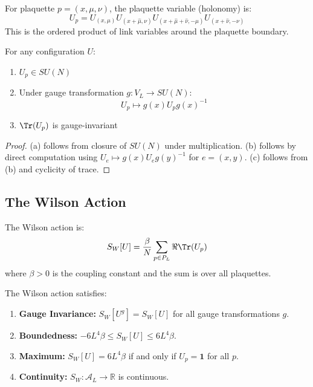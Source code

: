 \begin{definition}
\label{def:plaquette-var}
For plaquette $p = (x, \mu, \nu)$, the plaquette variable (holonomy) is:
\[
U_p = U_{(x,\mu)} U_{(x+\hat{\mu},\nu)} U_{(x+\hat{\mu}+\hat{\nu},-\mu)} U_{(x+\hat{\nu},-\nu)}
\]
This is the ordered product of link variables around the plaquette boundary.
\end{definition}

\begin{lemma}
\label{lem:plaquette-props}
For any configuration $U$:
\begin{enumerate}[label=(\alph*)]
    \item $U_p \in SU(N)$
    \item Under gauge transformation $g : V_L \to SU(N)$:
    \[
    U_p \mapsto g(x) U_p g(x)^{-1}
    \]
    \item $\Tr(U_p)$ is gauge-invariant
\end{enumerate}
\end{lemma}

\begin{proof}
(a) follows from closure of $SU(N)$ under multiplication.
(b) follows by direct computation using $U_e \mapsto g(x)U_e g(y)^{-1}$ for $e = (x,y)$.
(c) follows from (b) and cyclicity of trace.
\end{proof}

\subsection{The Wilson Action}

\begin{definition}
\label{def:wilson-action}
\label{def:wilson_action}
The Wilson action is:
\[
S_W[U] = \frac{\beta}{N} \sum_{p \in P_L} \Re \Tr(U_p)
\]
where $\beta > 0$ is the coupling constant and the sum is over all plaquettes.
\end{definition}

\begin{lemma}
\label{lem:action-props}
The Wilson action satisfies:
\begin{enumerate}[label=(\alph*)]
    \item \textbf{Gauge Invariance:} $S_W[U^g] = S_W[U]$ for all gauge transformations $g$.
    \item \textbf{Boundedness:} $-6L^4\beta \leq S_W[U] \leq 6L^4\beta$.
    \item \textbf{Maximum:} $S_W[U] = 6L^4\beta$ if and only if $U_p = \mathbf{1}$ for all $p$.
    \item \textbf{Continuity:} $S_W : \mathcal{A}_L \to \mathbb{R}$ is continuous.
\end{enumerate}
\end{lemma}

